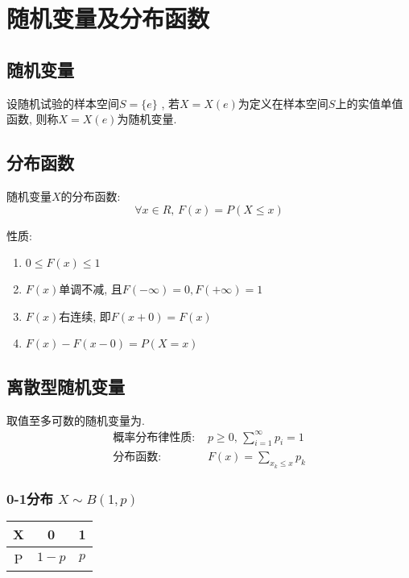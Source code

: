 \newpage
\section{随机变量及分布函数}

\subsection{随机变量}
\begin{definition}
    设随机试验的样本空间$S=\{e\}$ , 若$X=X(e)$为定义在样本空间$S$上的实值单值函数, 则称$X=X(e)$为随机变量. 
\end{definition}

\subsection{分布函数}
\begin{definition}
    随机变量$X$的分布函数: 
    \[ \forall x \in R, \, F(x)=P(X\le x) \]
\end{definition}

性质: 
\begin{enumerate}
    \item $0\le F(x) \le 1$
    \item $F(x)$单调不减, 且$F(-\infty )=0, F(+\infty)=1$
    \item $F(x)$右连续, 即$F(x+0)=F(x)$
    \item $F(x)-F(x-0)=P(X=x)$
\end{enumerate}

\subsection{离散型随机变量}
\begin{definition}
    取值至多可数的随机变量为. 
    \begin{align*}
        \text{概率分布律性质: }& p\ge 0,\,\sum_{i=1}^{\infty}p_i=1\\
        \text{分布函数: }& F(x)=\sum_{x_k\le x} p_k
    \end{align*}
\end{definition}

\subsubsection{0-1分布 \texorpdfstring{$X\sim B(1,p)$}.}
\begin{table}[H]
    \centering
    \begin{tabular}[c]{|c|cc|}\hline
        X & 0 & 1\\ \hline
        P & $1-p$ & $p$\\ \hline
    \end{tabular}
\end{table}

